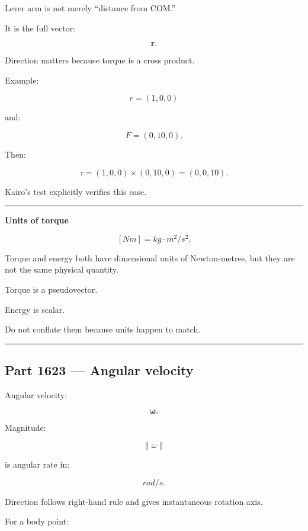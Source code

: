 \hypertarget{06-engine-ii-ch035-part-1622-lever-arm-vectors}{}

Lever arm is not merely ``distance from COM.''

It is the full vector:

\[
\mathbf{r}.
\]

Direction matters because torque is a cross product.

Example:

\[
r=(1,0,0)
\]

and:

\[
F=(0,10,0).
\]

Then:

\[
\tau
=
(1,0,0)
\times
(0,10,0)
=
(0,0,10).
\]

Kairo's test explicitly verifies this case.

\begin{center}\rule{0.5\linewidth}{0.5pt}\end{center}

\textbf{Units of torque}

\[
[Nm]
=
kg\cdot m^2/s^2.
\]

Torque and energy both have dimensional units of Newton-metres, but they are not the same physical quantity.

Torque is a pseudovector.

Energy is scalar.

Do not conflate them because units happen to match.

\begin{center}\rule{0.5\linewidth}{0.5pt}\end{center}

\subsection{Part 1623 --- Angular velocity}\label{06-engine-ii-ch035-part-1623-angular-velocity}

\hypertarget{06-engine-ii-ch035-part-1623-angular-velocity}{}

Angular velocity:

\[
\boldsymbol{\omega}.
\]

Magnitude:

\[
\|\omega\|
\]

is angular rate in:

\[
rad/s.
\]

Direction follows right-hand rule and gives instantaneous rotation axis.

For a body point:

